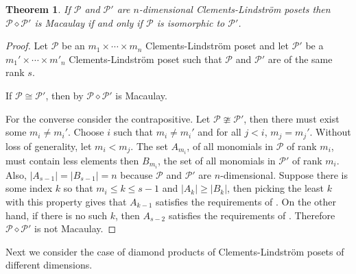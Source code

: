 \documentclass[11pt, reqno]{amsart}
\renewcommand{\P}{{\mathcal P}}
\theoremstyle{plain} %
\newtheorem{thm}{Theorem}[section]
\theoremstyle{definition}
\theoremstyle{remark}
\numberwithin{equation}{section}  %
\begin{document}
\begin{thm} \label{thm: diamond product of n dimensional box sets}
    If $\P$ and $\P'$ are $n$-dimensional Clements-Lindstr\"om posets %
    then $\P \diamond \P'$ is Macaulay if and only if $\P$ is isomorphic to $\P'$.
\end{thm}

\begin{proof}
Let $\P$ be an $m_1 \times \cdots \times m_n$ Clements-Lindstr\"om poset and let $\P'$ be a $m_1'\times \cdots\times m'_n$ Clements-Lindstr\"om poset such that $\P$ and $\P'$ are of the same rank $s$. 

If $\P \cong \P'$, then by  $\P \diamond \P'$ is Macaulay. 
    
For the converse consider the contrapositive. Let $\P \ncong \P'$, then there must exist some $m_i \neq m_i'$. Choose $i$ such that $m_i \neq m_i'$ and for all $j < i$, $m_j = m_j'$. Without loss of generality, let $m_i < m_j$. The set $A_{m_i}$, of all monomials in $\P$ of rank $m_i$, must contain less elements then $B_{m_i}$, the set of all monomials in $\P'$ of rank $m_i$. Also, $|A_{s-1}| = |B_{s-1}|=n$ because  $\P$ and $\P'$ are $n$-dimensional. Suppose there is some index $k$ so that $m_i\leq k\leq s-1$ and $|A_k| \geq |B_k|$, then picking the least $k$ with this property gives that $A_{k-1}$ satisfies the requirements of .  On the other hand, if there is no such $k$, then $A_{s-2}$ satisfies the requirements of . Therefore $\P \diamond \P'$ is not Macaulay.
\end{proof}

Next we consider the case of diamond products of Clements-Lindstr\"om posets of different dimensions.
\end{document}
